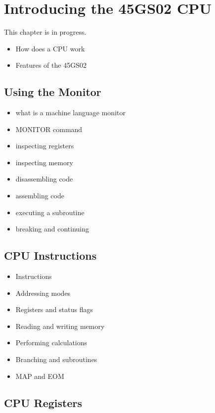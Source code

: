 \chapter{Introducing the 45GS02 CPU}
\label{cha:introducing-the-45gs02-cpu}

This chapter is in progress.

\begin{itemize}
\item How does a CPU work
\item Features of the 45GS02
\end{itemize}

\section{Using the Monitor}

\begin{itemize}
    \item what is a machine language monitor
\item MONITOR command
\item inspecting registers
\item inspecting memory
\item disassembling code
\item assembling code
\item executing a subroutine
\item breaking and continuing
\end{itemize}

\section{CPU Instructions}

\begin{itemize}
    \item Instructions
\item Addressing modes
\end{itemize}

\begin{itemize}
    \item Registers and status flags
\item Reading and writing memory
\item Performing calculations
\item Branching and subroutines
\item MAP and EOM
\end{itemize}

\section{CPU Registers}

